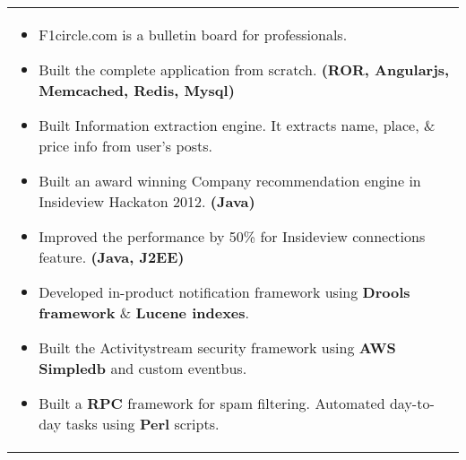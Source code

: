 \documentclass{article}
\begin{document}
\begin{tabular}{p{\dimexpr\linewidth-2\tabcolsep}}
    \bigskip
    \begin{itemize}
      \item F1circle.com is a bulletin board for professionals.
      \item Built the complete application from scratch. \textbf{(ROR, Angularjs, Memcached, Redis, Mysql)}
      \item Built Information extraction engine. It extracts name, place, \& price info from user's posts.
    \end{itemize}

    \bigskip
    \begin{itemize}
      \item Built an award winning Company recommendation engine in Insideview Hackaton 2012. \textbf{(Java)}
      \item Improved the performance by 50\% for Insideview connections feature. \textbf{(Java, J2EE)}
      \item Developed in-product notification framework using \textbf{Drools framework} \& \textbf{Lucene indexes}.
      \item Built the Activitystream security framework using \textbf{AWS Simpledb} and custom eventbus.
    \end{itemize}

    \bigskip
    \begin{itemize}
      \item Built a \textbf{RPC} framework for spam filtering.  Automated day-to-day tasks using \textbf{Perl} scripts.
    \end{itemize}

\end{tabular}
\end{document}
